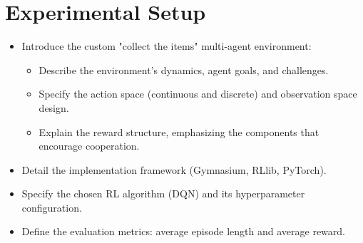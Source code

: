 \documentclass[sigconf]{acmart}
\begin{document}
\section{Experimental Setup}
\begin{itemize}
\item Introduce the custom "collect the items" multi-agent environment:
\begin{itemize}
\item Describe the environment's dynamics, agent goals, and challenges.
\item Specify the action space (continuous and discrete) and observation space design.
\item Explain the reward structure, emphasizing the components that encourage cooperation.
\end{itemize}
\item Detail the implementation framework (Gymnasium, RLlib, PyTorch).
\item Specify the chosen RL algorithm (DQN) and its hyperparameter configuration.
\item Define the evaluation metrics: average episode length and average reward.
\end{itemize}
\end{document}
